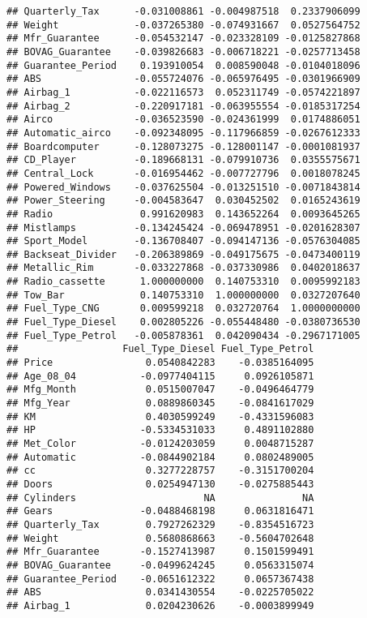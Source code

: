 \documentclass[]{article}
\begin{document}
\begin{verbatim}
## Quarterly_Tax      -0.031008861 -0.004987518  0.2337906099
## Weight             -0.037265380 -0.074931667  0.0527564752
## Mfr_Guarantee      -0.054532147 -0.023328109 -0.0125827868
## BOVAG_Guarantee    -0.039826683 -0.006718221 -0.0257713458
## Guarantee_Period    0.193910054  0.008590048 -0.0104018096
## ABS                -0.055724076 -0.065976495 -0.0301966909
## Airbag_1           -0.022116573  0.052311749 -0.0574221897
## Airbag_2           -0.220917181 -0.063955554 -0.0185317254
## Airco              -0.036523590 -0.024361999  0.0174886051
## Automatic_airco    -0.092348095 -0.117966859 -0.0267612333
## Boardcomputer      -0.128073275 -0.128001147 -0.0001081937
## CD_Player          -0.189668131 -0.079910736  0.0355575671
## Central_Lock       -0.016954462 -0.007727796  0.0018078245
## Powered_Windows    -0.037625504 -0.013251510 -0.0071843814
## Power_Steering     -0.004583647  0.030452502  0.0165243619
## Radio               0.991620983  0.143652264  0.0093645265
## Mistlamps          -0.134245424 -0.069478951 -0.0201628307
## Sport_Model        -0.136708407 -0.094147136 -0.0576304085
## Backseat_Divider   -0.206389869 -0.049175675 -0.0473400119
## Metallic_Rim       -0.033227868 -0.037330986  0.0402018637
## Radio_cassette      1.000000000  0.140753310  0.0095992183
## Tow_Bar             0.140753310  1.000000000  0.0327207640
## Fuel_Type_CNG       0.009599218  0.032720764  1.0000000000
## Fuel_Type_Diesel    0.002805226 -0.055448480 -0.0380736530
## Fuel_Type_Petrol   -0.005878361  0.042090434 -0.2967171005
##                  Fuel_Type_Diesel Fuel_Type_Petrol
## Price                0.0540842283    -0.0385164095
## Age_08_04           -0.0977404115     0.0926105871
## Mfg_Month            0.0515007047    -0.0496464779
## Mfg_Year             0.0889860345    -0.0841617029
## KM                   0.4030599249    -0.4331596083
## HP                  -0.5334531033     0.4891102880
## Met_Color           -0.0124203059     0.0048715287
## Automatic           -0.0844902184     0.0802489005
## cc                   0.3277228757    -0.3151700204
## Doors                0.0254947130    -0.0275885443
## Cylinders                      NA               NA
## Gears               -0.0488468198     0.0631816471
## Quarterly_Tax        0.7927262329    -0.8354516723
## Weight               0.5680868663    -0.5604702648
## Mfr_Guarantee       -0.1527413987     0.1501599491
## BOVAG_Guarantee     -0.0499624245     0.0563315074
## Guarantee_Period    -0.0651612322     0.0657367438
## ABS                  0.0341430554    -0.0225705022
## Airbag_1             0.0204230626    -0.0003899949

\end{verbatim}
\end{document}
